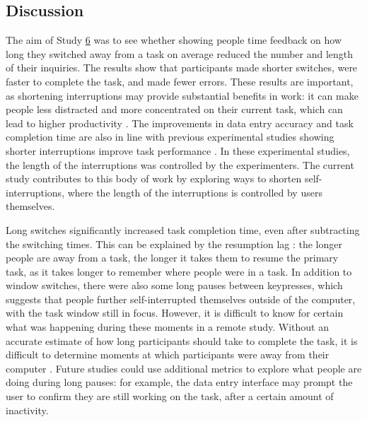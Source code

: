 \subsection{Discussion}
The aim of Study \hyperref[st:Study6]{6} was to see whether showing people time feedback on how long they switched away from a task on average reduced the number and length of their inquiries. The results show that participants made shorter switches, were faster to complete the task, and made fewer errors. These results are important, as shortening interruptions may provide substantial benefits in work: it can make people less distracted and more concentrated on their current task, which can lead to higher productivity \citep{Iqbal2010, Mark2018}. The improvements in data entry accuracy and task completion time are also in line with previous experimental studies showing shorter interruptions improve task performance \citep{Altmann2017, Monk2008}. In these experimental studies, the length of the interruptions was controlled by the experimenters. The current study contributes to this body of work by exploring ways to shorten self-interruptions, where the length of the interruptions is controlled by users themselves.

Long switches significantly increased task completion time, even after subtracting the switching times. This can be explained by the resumption lag \citep{Altmann2004}: the longer people are away from a task, the longer it takes them to resume the primary task, as it takes longer to remember where people were in a task.
In addition to window switches, there were also some long pauses between keypresses, which suggests that people further self-interrupted themselves outside of the computer, with the task window still in focus. However, it is difficult to know for certain what was happening during these moments in a remote study. Without an accurate estimate of how long participants should take to complete the task, it is difficult to determine moments at which participants were away from their computer \citep{Rzeszotarski2013}. Future studies could use additional metrics to explore what people are doing during long pauses: for example, the data entry interface may prompt the user to confirm they are still working on the task, after a certain amount of inactivity.

